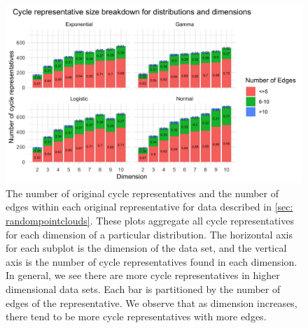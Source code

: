 \newpage 
 \begin{figure}[h!]
\begin{center}
\includegraphics[width=1\textwidth]{figures/generator_breakdown.jpg} 
\end{center}
\caption{The number of original cycle representatives and the number of edges within each original representative for data described in \se \ref{sec: randompointclouds}. These plots aggregate all cycle representatives for each dimension of a particular distribution. The horizontal axis for each subplot is the dimension of the data set, and the vertical axis is the number of cycle representatives found in each dimension. In general, we see there are more cycle representatives in higher dimensional data sets. Each bar is partitioned by the number of edges of the representative. We observe that as dimension increases, there tend to be more cycle representatives with more edges. 
}\label{fig:gen_num_breakdown}
\end{figure}

